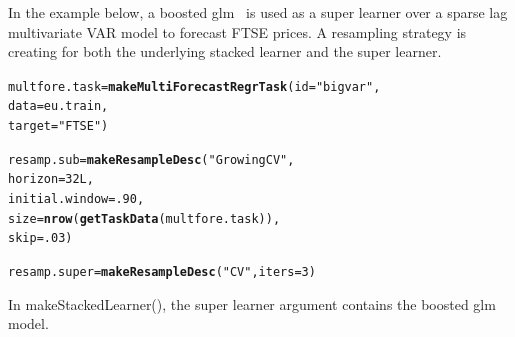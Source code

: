 \documentclass[12pt]{article}\usepackage[]{graphicx}\usepackage[]{color}
\makeatletter
\newcommand{\hlnum}[1]{\textcolor[rgb]{0.686,0.059,0.569}{#1}}%
\newcommand{\hlstr}[1]{\textcolor[rgb]{0.192,0.494,0.8}{#1}}%
\newcommand{\hlstd}[1]{\textcolor[rgb]{0.345,0.345,0.345}{#1}}%
\newcommand{\hlkwb}[1]{\textcolor[rgb]{0.69,0.353,0.396}{#1}}%
\newcommand{\hlkwc}[1]{\textcolor[rgb]{0.333,0.667,0.333}{#1}}%
\newcommand{\hlkwd}[1]{\textcolor[rgb]{0.737,0.353,0.396}{\textbf{#1}}}%
\newenvironment{kframe}{%
 \def\at@end@of@kframe{}%
 \ifinner\ifhmode%
  \def\at@end@of@kframe{\end{minipage}}%
  \begin{minipage}{\columnwidth}%
 \fi\fi%
 \def\FrameCommand##1{\hskip\@totalleftmargin \hskip-\fboxsep
 \colorbox{shadecolor}{##1}\hskip-\fboxsep
     \hskip-\linewidth \hskip-\@totalleftmargin \hskip\columnwidth}%
 \MakeFramed {\advance\hsize-\width
   \@totalleftmargin\z@ \linewidth\hsize
   \@setminipage}}%
 {\par\unskip\endMakeFramed%
 \at@end@of@kframe}
\newenvironment{knitrout}{}{} %
\theoremstyle{definition}
\newcommand\code{\@codex}
\def\@codex#1{{\normalfont\ttfamily\hyphenchar\font=-1 #1}}
\makeatother
\begin{document}
In the example below, a boosted glm~\cite{glmboost} is used as a super learner over a sparse lag multivariate VAR model to forecast FTSE prices. A resampling strategy is creating for both the underlying stacked learner and the super learner.

\singlespacing
\begin{knitrout}
\color{fgcolor}\begin{kframe}
\begin{alltt}
\hlstd{multfore.task} \hlkwb{=} \hlkwd{makeMultiForecastRegrTask}\hlstd{(}\hlkwc{id} \hlstd{=} \hlstr{"bigvar"}\hlstd{,}
                                          \hlkwc{data} \hlstd{= eu.train,}
                                          \hlkwc{target} \hlstd{=} \hlstr{"FTSE"}\hlstd{)}

\hlstd{resamp.sub} \hlkwb{=} \hlkwd{makeResampleDesc}\hlstd{(}\hlstr{"GrowingCV"}\hlstd{,}
                          \hlkwc{horizon} \hlstd{=} \hlnum{32L}\hlstd{,}
                          \hlkwc{initial.window} \hlstd{=} \hlnum{.90}\hlstd{,}
                          \hlkwc{size} \hlstd{=} \hlkwd{nrow}\hlstd{(}\hlkwd{getTaskData}\hlstd{(multfore.task)),}
                          \hlkwc{skip} \hlstd{=} \hlnum{.03}\hlstd{)}

\hlstd{resamp.super} \hlkwb{=} \hlkwd{makeResampleDesc}\hlstd{(}\hlstr{"CV"}\hlstd{,} \hlkwc{iters} \hlstd{=} \hlnum{3}\hlstd{)}
\end{alltt}
\end{kframe}
\end{knitrout}
\doublespacing

In \code{makeStackedLearner()}, the super learner argument contains the boosted glm model.
\end{document}
